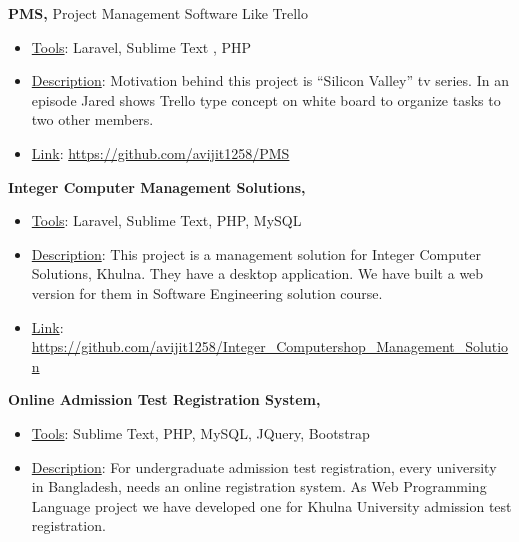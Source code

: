 \documentclass[margin]{res}
\begin{document}
\begin{resume}
\begin{itemize}
		 \end{itemize}

                  {\bf PMS, }  Project Management Software Like Trello 
                 \begin{itemize} \itemsep -2pt

               \item \underline{Tools}: Laravel, Sublime Text , PHP  
                 
                \item  \underline{Description}:  
                Motivation behind this project is ``Silicon Valley'' tv series. In an episode Jared shows Trello type concept on white board to organize tasks to two other members.  
              \item \underline{Link}: \url{https://github.com/avijit1258/PMS}
            
		 \end{itemize}

     {\bf Integer Computer Management Solutions,}   
                 \begin{itemize} \itemsep -2pt

               \item \underline{Tools}:  Laravel, Sublime Text, PHP, MySQL   
                 
                \item  \underline{Description}:  This project is a management solution for 
                Integer Computer Solutions, Khulna. They have a desktop application. We have built a web version for them in Software Engineering solution course.

               \item \underline{Link}: \url{https://github.com/avijit1258/Integer_Computershop_Management_Solution}
				
     \end{itemize}

     {\bf Online Admission Test Registration System,}   
                 \begin{itemize} \itemsep -2pt

               \item \underline{Tools}:  Sublime Text, PHP, MySQL, JQuery, Bootstrap   
                 
                \item  \underline{Description}:  For undergraduate admission test registration, every university in Bangladesh, needs an online registration system. As Web Programming Language project we have developed one for Khulna University admission test registration.



\end{itemize}
\end{resume}
\end{document}
